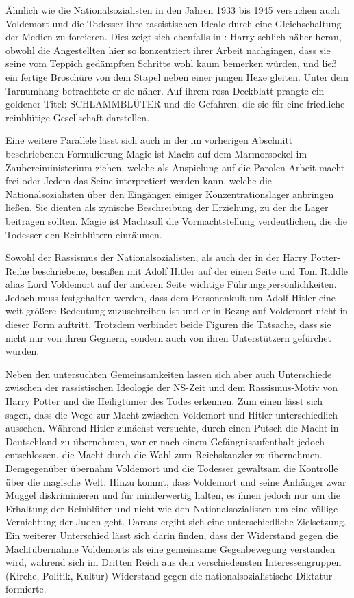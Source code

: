 Ähnlich wie die Nationalsozialisten in den Jahren 1933 bis 1945 versuchen auch Voldemort und die Todesser ihre rassistischen Ideale durch eine \glqq Gleichschaltung\grqq{} der Medien zu forcieren.
Dies zeigt sich ebenfalls in \cite[S.\,256]{JKR10}: \glqq Harry schlich näher heran, obwohl die Angestellten hier so konzentriert ihrer Arbeit nachgingen, dass sie seine vom Teppich gedämpften Schritte wohl kaum bemerken würden, und ließ ein fertige Broschüre von dem Stapel neben einer jungen Hexe gleiten. Unter dem Tarnumhang betrachtete er sie näher. Auf ihrem rosa Deckblatt prangte ein goldener Titel: SCHLAMMBLÜTER und die Gefahren, die sie für eine friedliche reinblütige Gesellschaft darstellen\grqq.

Eine weitere Parallele lässt sich auch in der im vorherigen Abschnitt beschriebenen Formulierung \glqq Magie ist Macht\grqq{} auf dem Marmorsockel im Zaubereiministerium ziehen, welche als Anspielung auf die Parolen  \glqq Arbeit macht frei\grqq{} oder \glqq Jedem das Seine\grqq{} interpretiert werden kann, welche die Nationalsozialisten über den Eingängen einiger Konzentrationslager anbringen ließen.
Sie dienten als zynische Beschreibung der \glqq Erziehung\grqq, zu der die Lager beitragen sollten.
\glqq Magie ist Macht\grqq soll die Vormachtstellung verdeutlichen, die die Todesser den \glqq Reinblütern\grqq{} einräumen.

Sowohl der Rassismus der Nationalsozialisten, als auch der in der \glqq Harry Potter\grqq{}-Reihe beschriebene, besaßen mit Adolf Hitler auf der einen Seite und Tom Riddle alias Lord Voldemort auf der anderen Seite wichtige Führungspersönlichkeiten.
Jedoch muss festgehalten werden, dass dem Personenkult um Adolf Hitler eine weit größere Bedeutung zuzuschreiben ist und er in Bezug auf Voldemort nicht in dieser Form auftritt.
Trotzdem verbindet beide Figuren die Tatsache, dass sie nicht nur von ihren Gegnern, sondern auch von ihren Unterstützern gefürchet wurden\cite[S.\,15]{JKR10}. 

Neben den untersuchten Gemeinsamkeiten lassen sich aber auch  Unterschiede zwischen der rassistischen Ideologie der NS-Zeit und dem Rassismus-Motiv von \glqq Harry Potter und die Heiligtümer des Todes\grqq{} erkennen.
Zum einen lässt sich sagen, dass die Wege zur Macht zwischen Voldemort und Hitler unterschiedlich aussehen.
Während Hitler zunächst versuchte, durch einen Putsch die Macht in Deutschland zu übernehmen, war er nach einem Gefängnisaufenthalt jedoch entschlossen, die Macht durch die Wahl zum Reichskanzler zu übernehmen\cite[S.\,12-27]{MW121}. 
Demgegenüber übernahm Voldemort und die Todesser gewaltsam die Kontrolle über die magische Welt\cite[S.\,13]{JKR10}. 
Hinzu kommt, dass Voldemort und seine Anhänger zwar Muggel diskriminieren und für minderwertig halten, es ihnen jedoch nur um die Erhaltung der Reinblüter und nicht wie den Nationalsozialisten um eine völlige Vernichtung der Juden geht\cite[S.43]{MW123}.
Daraus ergibt sich eine unterschiedliche Zielsetzung.
Ein weiterer Unterschied lässt sich darin finden, dass der Widerstand gegen die Machtübernahme Voldemorts als eine gemeinsame Gegenbewegung verstanden wird, während sich im Dritten Reich aus den verschiedensten Interessengruppen (Kirche, Politik, Kultur) Widerstand gegen die nationalsozialistische Diktatur formierte.

